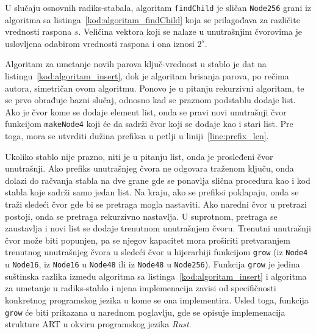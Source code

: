 \documentclass[12pt,oneside]{memoir}
\begin{document}
U slučaju osnovnih radiks-stabala, algoritam \texttt{findChild}
je sličan \texttt{Node256} grani iz
algoritma sa listinga~\ref{kod:algoritam_findChild} koja
se prilagođava za različite vrednosti raspona $s$.
Veličina vektora koji se nalaze u unutrašnjim
čvorovima je uslovljena odabirom vrednosti raspona
i ona iznosi $2^{s}$.

Algoritam za umetanje novih parova ključ-vrednost u stablo je dat
na listingu~\ref{kod:algoritam_insert}, dok je algoritam brisanja
parova, po rečima autora, simetričan ovom algoritmu. Ponovo je u pitanju
rekurzivni algoritam, te se prvo obrađuje bazni slučaj, odnosno kad
se praznom podstablu dodaje list. Ako je čvor kome se dodaje
element list, onda se pravi novi unutrašnji čvor funkcijom
\texttt{makeNode4} koji će da sadrži čvor koji se dodaje
kao i stari list. Pre toga, mora se utvrditi dužina prefiksa
u petlji u liniji~\ref{line:prefix_len}.

Ukoliko stablo nije prazno, niti je u pitanju list, onda je
prosleđeni čvor unutrašnji. Ako prefiks unutrašnjeg
čvora ne odgovara traženom ključu, onda dolazi do račvanja
stabla na dve grane gde se ponavlja slična procedura
kao i kod stabla koje sadrži samo jedan list. Na kraju, ako se
prefiksi poklapaju, onda se traži sledeći čvor gde bi se
pretraga mogla nastaviti. Ako naredni čvor u pretrazi postoji,
onda se pretraga rekurzivno nastavlja. U suprotnom, pretraga se
zaustavlja i novi list se dodaje trenutnom unutrašnjem čvoru.
Trenutni unutrašnji čvor može biti popunjen, pa se njegov
kapacitet mora proširiti pretvaranjem trenutnog
unutrašnjeg čvora u sledeći čvor u hijerarhiji funkcijom
\texttt{grow} (iz \texttt{Node4}
u \texttt{Node16}, iz \texttt{Node16} u \texttt{Node48} ili
iz \texttt{Node48} u \texttt{Node256}). Funkcija \texttt{grow}
je jedina suštinska razlika između algoritma sa
listinga~\ref{kod:algoritam_insert} i algoritma za umetanje u
radiks-stablo i njena implemenacija zavisi od specifičnosti
konkretnog programskog jezika u kome se ona implementira.
Usled toga, funkcija \texttt{grow} će
biti prikazana u narednom poglavlju, gde se opisuje
implemenacija strukture ART u okviru programskog jezika
\textit{Rust}.
\end{document}
